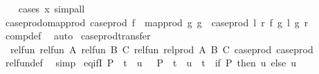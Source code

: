 \begin{isabellebody}
%
\isadelimproof
\ \ %
\endisadelimproof
%
\isatagproof
{}\isamarkupfalse%
\ {\isacharparenleft}{\kern0pt}cases\ x{\isacharparenright}{\kern0pt}\ simp{\isacharunderscore}{\kern0pt}all%
\endisatagproof
{\isafoldproof}%
%
\isadelimproof
\isanewline
%
\endisadelimproof
\isanewline
{}\isamarkupfalse%
\ case{\isacharunderscore}{\kern0pt}prod{\isacharunderscore}{\kern0pt}o{\isacharunderscore}{\kern0pt}map{\isacharunderscore}{\kern0pt}prod{\isacharcolon}{\kern0pt}\ {\isachardoublequoteopen}case{\isacharunderscore}{\kern0pt}prod\ f\ {\isasymcirc}\ map{\isacharunderscore}{\kern0pt}prod\ g{}\ g{}\ {\isacharequal}{\kern0pt}\ case{\isacharunderscore}{\kern0pt}prod\ {\isacharparenleft}{\kern0pt}{\isasymlambda}l\ r{\isachardot}{\kern0pt}\ f\ {\isacharparenleft}{\kern0pt}g{}\ l{\isacharparenright}{\kern0pt}\ {\isacharparenleft}{\kern0pt}g{}\ r{\isacharparenright}{\kern0pt}{\isacharparenright}{\kern0pt}{\isachardoublequoteclose}\isanewline
%
\isadelimproof
\ \ %
\endisadelimproof
%
\isatagproof
{}\isamarkupfalse%
\ comp{\isacharunderscore}{\kern0pt}def\ \isamarkupfalse%
\ auto%
\endisatagproof
{\isafoldproof}%
%
\isadelimproof
\isanewline
%
\endisadelimproof
\isanewline
{}\isamarkupfalse%
\ case{\isacharunderscore}{\kern0pt}prod{\isacharunderscore}{\kern0pt}transfer{\isacharcolon}{\kern0pt}\isanewline
\ \ {\isachardoublequoteopen}{\isacharparenleft}{\kern0pt}rel{\isacharunderscore}{\kern0pt}fun\ {\isacharparenleft}{\kern0pt}rel{\isacharunderscore}{\kern0pt}fun\ A\ {\isacharparenleft}{\kern0pt}rel{\isacharunderscore}{\kern0pt}fun\ B\ C{\isacharparenright}{\kern0pt}{\isacharparenright}{\kern0pt}\ {\isacharparenleft}{\kern0pt}rel{\isacharunderscore}{\kern0pt}fun\ {\isacharparenleft}{\kern0pt}rel{\isacharunderscore}{\kern0pt}prod\ A\ B{\isacharparenright}{\kern0pt}\ C{\isacharparenright}{\kern0pt}{\isacharparenright}{\kern0pt}\ case{\isacharunderscore}{\kern0pt}prod\ case{\isacharunderscore}{\kern0pt}prod{\isachardoublequoteclose}\isanewline
%
\isadelimproof
\ \ %
\endisadelimproof
%
\isatagproof
{}\isamarkupfalse%
\ rel{\isacharunderscore}{\kern0pt}fun{\isacharunderscore}{\kern0pt}def\ \isamarkupfalse%
\ simp%
\endisatagproof
{\isafoldproof}%
%
\isadelimproof
\isanewline
%
\endisadelimproof
\isanewline
{}\isamarkupfalse%
\ eq{\isacharunderscore}{\kern0pt}ifI{\isacharcolon}{\kern0pt}\ {\isachardoublequoteopen}{\isacharparenleft}{\kern0pt}P\ {\isasymlongrightarrow}\ t\ {\isacharequal}{\kern0pt}\ u{}{\isacharparenright}{\kern0pt}\ {\isasymLongrightarrow}\ {\isacharparenleft}{\kern0pt}{\isasymnot}\ P\ {\isasymlongrightarrow}\ t\ {\isacharequal}{\kern0pt}\ u{}{\isacharparenright}{\kern0pt}\ {\isasymLongrightarrow}\ t\ {\isacharequal}{\kern0pt}\ {\isacharparenleft}{\kern0pt}if\ P\ then\ u{}\ else\ u{}{\isacharparenright}{\kern0pt}{\isachardoublequoteclose}\isanewline

\end{isabellebody}
